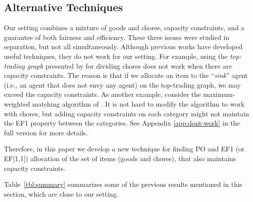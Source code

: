 \documentclass[sigconf]{aamas}
\theoremstyle{definition}
\begin{document}
\subsection{Alternative Techniques}
Our setting combines a mixture of goods and chores, capacity constraints, and a guarantee of both fairness and efficiency.
These three issues were studied in separation, but not all simultaneously.
Although previous works have developed useful techniques, they do not work for our setting.
For example, using the \emph{top-trading graph} presented by \citet{vaish2020} for dividing chores does not work when there are  capacity constraints.
The reason is that if we allocate an item to the ``\emph{sink}'' agent (i.e., an agent that does not envy any agent) on the top-trading graph, we may exceed the capacity constraints.
As another example, consider the maximum-weighted matching algorithm of \citet{brustle2019}. It is not hard to modify the algorithm to work with chores, but adding capacity constraints on each category might not maintain the EF1 property between the categories.
See Appendix \ref{app:dont-work} in the full version \citep{shoshan2022efficient} for more details.

Therefore, in this paper we develop a new technique for finding PO and EF1 (or EF[1,1]) allocation of the set of items (goods and chores), that also maintains capacity constraints.


Table~\ref{tbl:summary} summarizes some of the previous results mentioned in this section, which are close to our setting.
\end{document}
